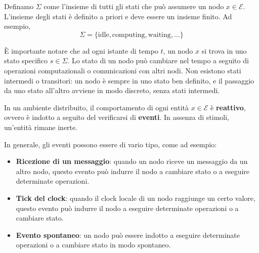 \begin{definizione}[Stato]
Definamo $\Sigma$ come l'insieme di tutti gli stati che può assumere un nodo $x \in \mathcal{E}$. L'insieme degli stati è definito a priori e deve essere un insieme finito. Ad esempio, 
\[
\Sigma = \{\text{idle}, \text{computing}, \text{waiting}, \dots\}
\]

È importante notare che ad ogni istante di tempo $t$, un nodo $x$ si trova in uno stato specifico $s \in \Sigma$. Lo stato di un nodo può cambiare nel tempo a seguito di operazioni computazionali o comunicazioni con altri nodi. Non esistono stati intermedi o transitori: un nodo è sempre in uno stato ben definito, e il passaggio da uno stato all'altro avviene in modo discreto, senza stati intermedi.
\end{definizione}

\begin{definizione}[Evento]
In un ambiente distribuito, il comportamento di ogni entità $x \in \mathcal{E}$ è \textbf{reattivo}, ovvero è indotto a
seguito del verificarsi di \textbf{eventi}. In assenza di stimoli, un'entità rimane inerte.

In generale, gli eventi possono essere di vario tipo, come ad esempio:
\begin{itemize}
    \item \textbf{Ricezione di un messaggio}: quando un nodo riceve un messaggio da un altro nodo, questo evento può indurre il nodo a cambiare stato o a eseguire determinate operazioni. 
    \item \textbf{Tick del clock}: quando il clock locale di un nodo raggiunge un certo valore, questo evento può indurre il nodo a eseguire determinate operazioni o a cambiare stato.
    \item \textbf{Evento spontaneo}: un nodo può essere indotto a eseguire determinate operazioni o a cambiare stato in modo spontaneo.
\end{itemize}
\end{definizione}

